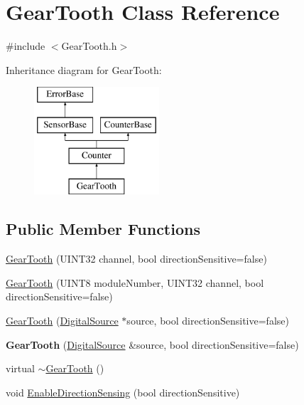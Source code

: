\hypertarget{classGearTooth}{
\section{GearTooth Class Reference}
\label{classGearTooth}
}


{\ttfamily \#include $<$GearTooth.h$>$}

Inheritance diagram for GearTooth:\begin{figure}[H]
\begin{center}
\leavevmode
\includegraphics[height=4.000000cm]{classGearTooth}
\end{center}
\end{figure}
\subsection*{Public Member Functions}
\begin{DoxyCompactItemize}
\item 
\hyperlink{classGearTooth_ad11e01b0445488157a029faebe06b0a8}{GearTooth} (UINT32 channel, bool directionSensitive=false)
\item 
\hyperlink{classGearTooth_af478621c14567b03cdf20b7e9c57c712}{GearTooth} (UINT8 moduleNumber, UINT32 channel, bool directionSensitive=false)
\item 
\hyperlink{classGearTooth_a6d69ae72386bb5bc2977b40a05964281}{GearTooth} (\hyperlink{classDigitalSource}{DigitalSource} $\ast$source, bool directionSensitive=false)
\item 
\hypertarget{classGearTooth_a1c077b7e532f113cfa9b27c796155564}{
{\bfseries GearTooth} (\hyperlink{classDigitalSource}{DigitalSource} \&source, bool directionSensitive=false)}
\label{classGearTooth_a1c077b7e532f113cfa9b27c796155564}

\item 
virtual \hyperlink{classGearTooth_a53619e7569c7d259b039420cbb9b712f}{$\sim$GearTooth} ()
\item 
void \hyperlink{classGearTooth_a0bec962d2920dc28f8d4ef53b5fa2c65}{EnableDirectionSensing} (bool directionSensitive)
\end{DoxyCompactItemize}
